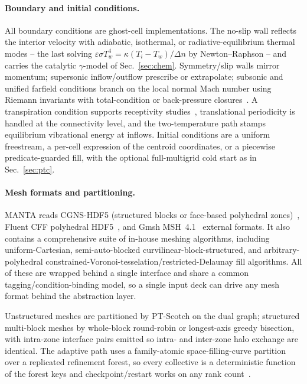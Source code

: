 \documentclass[journal,biblatex]{new-aiaa}
\begin{document}
\paragraph{Boundary and initial conditions.}
All boundary conditions are ghost-cell implementations. The no-slip wall reflects the interior velocity with adiabatic, isothermal, or radiative-equilibrium thermal modes -- the last solving $\varepsilon\sigma T_w^4=\kappa(T_i-T_w)/\Delta n$ by Newton--Raphson -- and carries the catalytic $\gamma$-model of Sec.~\ref{sec:chem}. Symmetry/slip walls mirror momentum; supersonic inflow/outflow prescribe or extrapolate; subsonic and unified farfield conditions branch on the local normal Mach number using Riemann invariants with total-condition or back-pressure closures~\cite{poinsot_boundary_1992}. A transpiration condition supports receptivity studies~\cite{fedorov_transition_2011}, translational periodicity is handled at the connectivity level, and the two-temperature path stamps equilibrium vibrational energy at inflows. Initial conditions are a uniform freestream, a per-cell expression of the centroid coordinates, or a piecewise predicate-guarded fill, with the optional full-multigrid cold start as in Sec.~\ref{sec:ptc}.

\paragraph{Mesh formats and partitioning.}
MANTA reads CGNS-HDF5 (structured blocks or face-based polyhedral zones)~\cite{poirier_cgns_1998,hauser_parallel_2004}, Fluent CFF polyhedral HDF5~\cite{noauthor_fluent_nodate}, and Gmsh MSH~4.1~\cite{geuzaine_gmsh_2009} external formats. It also contains a comprehensive suite of in-house meshing algorithms, including uniform-Cartesian, semi-auto-blocked curvilinear-block-structured, and arbitrary-polyhedral constrained-Voronoi-tesselation/restricted-Delaunay fill algorithms. All of these are wrapped behind a single interface and share a common tagging/condition-binding model, so a single input deck can drive any mesh format behind the abstraction layer.

Unstructured meshes are partitioned by PT-Scotch on the dual graph; structured multi-block meshes by whole-block round-robin or longest-axis greedy bisection, with intra-zone interface pairs emitted so intra- and inter-zone halo exchange are identical. The adaptive path uses a family-atomic space-filling-curve partition over a replicated refinement forest, so every collective is a deterministic function of the forest keys and checkpoint/restart works on any rank count~\cite{warren_parallel_1993,burstedde_p4est_2011}.
\end{document}
